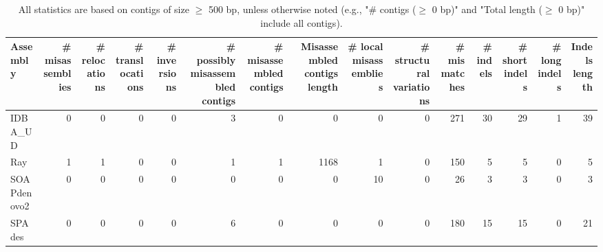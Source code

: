 \documentclass[12pt,a4paper]{article}
\begin{document}
\begin{table}[ht]
\begin{center}
\caption{All statistics are based on contigs of size $\geq$ 500 bp, unless otherwise noted (e.g., "\# contigs ($\geq$ 0 bp)" and "Total length ($\geq$ 0 bp)" include all contigs).}
\begin{tabular}{|l*{14}{|r}|}
\hline
Assembly & \# misassemblies &     \# relocations &     \# translocations &     \# inversions & \# possibly misassembled contigs & \# misassembled contigs & Misassembled contigs length & \# local misassemblies & \# structural variations & \# mismatches & \# indels &     \# short indels &     \# long indels & Indels length \\ \hline
IDBA\_UD & 0 & 0 & 0 & 0 & 3 & 0 & 0 & 0 & 0 & 271 & 30 & 29 & 1 & 39 \\ \hline
Ray & 1 & 1 & 0 & 0 & 1 & 1 & 1168 & 1 & 0 & 150 & 5 & 5 & 0 & 5 \\ \hline
SOAPdenovo2 & 0 & 0 & 0 & 0 & 0 & 0 & 0 & 10 & 0 & 26 & 3 & 3 & 0 & 3 \\ \hline
SPAdes & 0 & 0 & 0 & 0 & 6 & 0 & 0 & 0 & 0 & 180 & 15 & 15 & 0 & 21 \\ \hline
\end{tabular}
\end{center}
\end{table}
\end{document}
